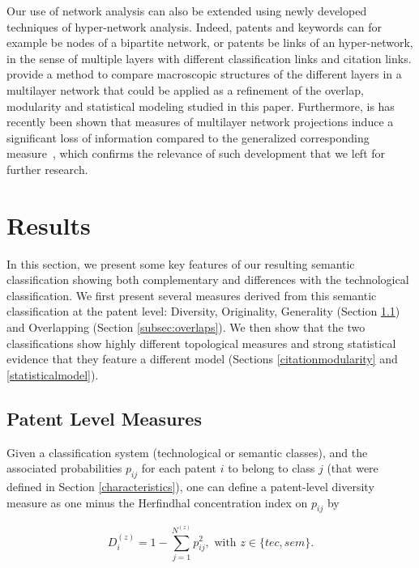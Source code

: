 \documentclass[12pt,twoside,a4paper]{article}
\begin{document}
Our use of network analysis can also be extended using newly developed techniques of hyper-network analysis. Indeed, patents and keywords can for example be nodes of a bipartite network, or patents be links of an hyper-network, in the sense of multiple layers with different classification links and citation links. \cite{iacovacci2015mesoscopic} provide a method to compare macroscopic structures of the different layers in a multilayer network that could be applied as a refinement of the overlap, modularity and statistical modeling studied in this paper. Furthermore, is has recently been shown that measures of multilayer network projections   induce a significant loss of information compared to the generalized corresponding measure~\cite{de2015ranking}, which confirms the relevance of such development that we left for further research.


\section{Results \label{result}}

In this section, we present some key features of our resulting semantic classification showing both complementary and differences with the technological classification. We first present several measures derived from this semantic classification at the patent level: Diversity, Originality, Generality (Section \ref{subsec:orig-gene}) and Overlapping (Section \ref{subsec:overlaps}). We then show that the two classifications show highly
different topological measures and strong statistical evidence that they feature a different model (Sections \ref{citationmodularity} and \ref{statisticalmodel}).


\subsection{Patent Level Measures}  \label{subsec:orig-gene}

Given a classification system (technological or semantic classes), and the associated probabilities $p_{ij}$ for each patent $i$ to belong to class $j$ (that were defined in Section \ref{characteristics}), one can define a patent-level diversity measure as one minus the Herfindhal concentration index on $p_{ij}$  by

\[
D_i^{(z)} = 1 - \sum_{j =1}^{N^{(z)}} {p_{ij}^2}, \text{ with } z \in \{tec, sem\}.
\]
\end{document}
